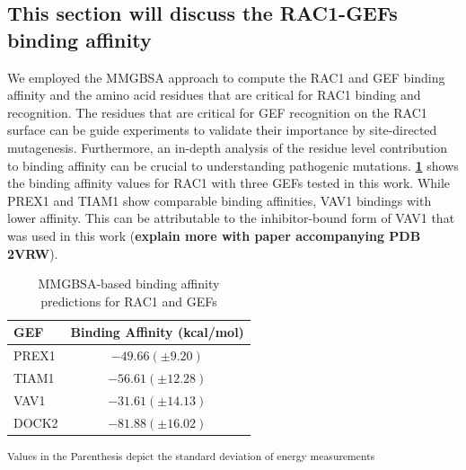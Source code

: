 \documentclass[12pt, a4paper]{achemso}
\begin{document}



\subsection{This section will discuss the RAC1-GEFs binding affinity}
    We employed the MMGBSA approach to compute the RAC1 and GEF binding affinity and the amino acid residues that are critical for RAC1 binding and recognition. The residues that are critical for GEF recognition on the RAC1 surface can be guide experiments to validate their importance by site-directed mutagenesis. Furthermore, an in-depth analysis of the residue level contribution to binding affinity can be crucial to understanding pathogenic mutations. \textbf{\ref{tbl:bindingaffinity}} shows the binding affinity values for RAC1 with three GEFs tested in this work. While PREX1 and TIAM1 show comparable binding affinities, VAV1 bindings with lower affinity. This can be attributable to the inhibitor-bound form of VAV1 that was used in this work (\textbf{explain more with paper accompanying PDB 2VRW}).
    
\begin{table}
  \caption{MMGBSA-based binding affinity predictions for RAC1 and GEFs}
  \label{tbl:bindingaffinity}
 \begin{tabular}{lc}
    \hline
   \textbf{GEF}  & \textbf{Binding Affinity (kcal/mol)} \\
    \hline
    PREX1	 & $-49.66(\pm 9.20)$  \\
    TIAM1 & $-56.61 (\pm 12.28)$ \\
    VAV1 & $-31.61 (\pm 14.13)$  \\
    DOCK2 & $-81.88 (\pm 16.02)$  \\
    \hline
  \end{tabular}
  
 \textsuperscript{Values in the Parenthesis depict the standard deviation of energy measurements}
\end{table}
\end{document}
